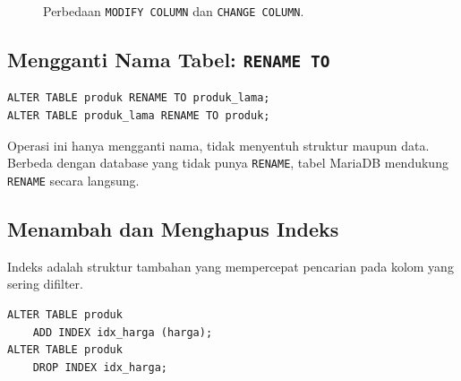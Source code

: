 \documentclass[11pt,a4paper]{article}
\begin{document}
\begin{figure}[H]
	\centering
	\caption{Perbedaan \texttt{MODIFY COLUMN} dan \texttt{CHANGE COLUMN}.}
	\label{fig:modify-change}
\end{figure}

\subsection{Mengganti Nama Tabel: \texttt{RENAME TO}}

\begin{lstlisting}[style=code]
ALTER TABLE produk RENAME TO produk_lama;
ALTER TABLE produk_lama RENAME TO produk;
\end{lstlisting}

Operasi ini hanya mengganti nama, tidak menyentuh struktur maupun data. Berbeda dengan database yang tidak punya \texttt{RENAME}, tabel MariaDB mendukung \texttt{RENAME} secara langsung.

\subsection{Menambah dan Menghapus Indeks}

Indeks adalah struktur tambahan yang mempercepat pencarian pada kolom yang sering difilter.

\begin{lstlisting}[style=code]
ALTER TABLE produk
    ADD INDEX idx_harga (harga);
ALTER TABLE produk
    DROP INDEX idx_harga;
\end{lstlisting}
\end{document}
